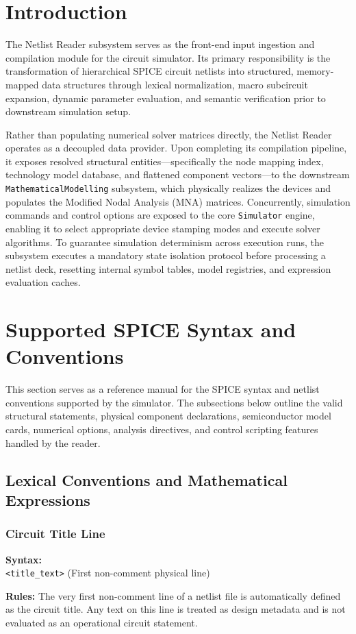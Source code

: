 \setlength{\parskip}{\baselineskip}

\section{Introduction}
The Netlist Reader subsystem serves as the front-end input ingestion and compilation module for the circuit simulator. Its primary responsibility is the transformation of hierarchical SPICE circuit netlists into structured, memory-mapped data structures through lexical normalization, macro subcircuit expansion, dynamic parameter evaluation, and semantic verification prior to downstream simulation setup.

Rather than populating numerical solver matrices directly, the Netlist Reader operates as a decoupled data provider. Upon completing its compilation pipeline, it exposes resolved structural entities—specifically the node mapping index, technology model database, and flattened component vectors—to the downstream \texttt{MathematicalModelling} subsystem, which physically realizes the devices and populates the Modified Nodal Analysis (MNA) matrices. Concurrently, simulation commands and control options are exposed to the core \texttt{Simulator} engine, enabling it to select appropriate device stamping modes and execute solver algorithms. To guarantee simulation determinism across execution runs, the subsystem executes a mandatory state isolation protocol before processing a netlist deck, resetting internal symbol tables, model registries, and expression evaluation caches.


\section{Supported SPICE Syntax and Conventions}
\label{sec:supported_syntax}

This section serves as a reference manual for the SPICE syntax and netlist conventions supported by the simulator. The subsections below outline the valid structural statements, physical component declarations, semiconductor model cards, numerical options, analysis directives, and control scripting features handled by the reader.

\subsection{Lexical Conventions and Mathematical Expressions}

\subsubsection{Circuit Title Line}
\begin{compactitem}
    \item \textbf{Syntax:} \\
    \texttt{<title\_text>} (First non-comment physical line)
    \item \textbf{Rules:} The very first non-comment line of a netlist file is automatically defined as the circuit title. Any text on this line is treated as design metadata and is not evaluated as an operational circuit statement.
\end{compactitem}

